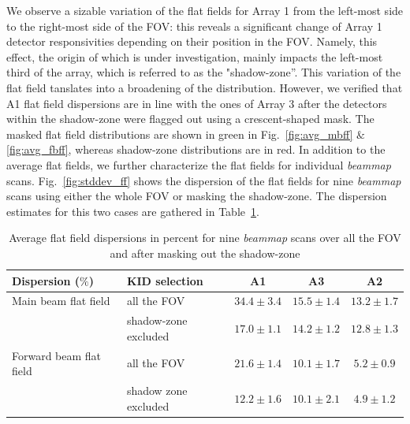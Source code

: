 We observe a sizable variation of the flat fields for Array 1 from the left-most side to the right-most side of the FOV: this reveals a significant change of Array 1 detector responsivities depending on their position in the FOV. Namely, this effect, the origin of which is under investigation, mainly impacts the left-most third of the array, which is referred to as the "shadow-zone''. This variation of the flat field tanslates into a broadening of the distribution. However, we verified that A1 flat field dispersions are in line with the ones of Array 3 after the detectors within the shadow-zone were flagged out using a crescent-shaped mask. The masked flat field distributions are shown in green in Fig.~\ref{fig:avg_mbff} $\&$ \ref{fig:avg_fbff}, whereas shadow-zone distributions are in red. In addition to the average flat fields, we further characterize the flat fields for individual \emph{beammap} scans. Fig.~\ref{fig:stddev_ff} shows the dispersion of the flat fields for nine \emph{beammap} scans using either the whole FOV or masking the shadow-zone. The dispersion estimates for this two cases are gathered in Table~\ref{tab:flatfields}.      

\begin{table}[h]
\begin{center}
\begin{tabular}{|l|l|c|c|c|}
\hline
 Dispersion ($\%$)    & KID selection  &  A1 & A3  & A2 \\
\hline
Main beam flat field  & all the FOV           & $34.4 \pm 3.4$    & $15.5 \pm 1.4$  &  $13.2 \pm 1.7$  \\
                      & shadow-zone excluded  & $17.0 \pm 1.1$    & $14.2 \pm 1.2$  &  $12.8 \pm 1.3$\\
\hline
Forward beam flat field  & all the FOV           & $21.6 \pm 1.4$  & $10.1 \pm 1.7$  & $5.2 \pm 0.9$   \\
                         & shadow zone excluded  & $12.2 \pm 1.6$  & $10.1 \pm 2.1$  & $4.9 \pm 1.2$ \\
\hline
\end{tabular}
\caption[Flat field dispersions]{Average flat field dispersions in percent for nine \emph{beammap} scans over all the FOV and after masking out the shadow-zone}
\end{center}
\label{tab:flatfields}
\end{table}


